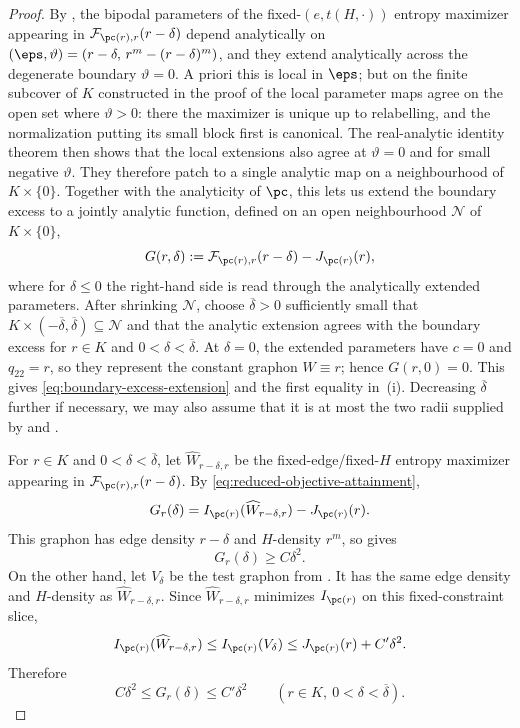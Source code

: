 \begin{proof}
By , the bipodal parameters of the fixed-$(e,t(H,\cdot))$
entropy maximizer appearing in $\mathcal F_{\pc(r),r}(r-\delta)$ depend
analytically on $(\eps,\vartheta)=(r-\delta,\,r^m-(r-\delta)^m)$, and they
extend analytically across the degenerate boundary $\vartheta=0$.  A priori
this is local in $\eps$; but on the finite subcover of $K$ constructed in the
proof of  the local parameter maps agree
on the open set where $\vartheta>0$: there the maximizer is unique up to
relabelling, and the normalization putting its small block first is canonical.
The real-analytic identity theorem then shows that the local extensions also
agree at $\vartheta=0$ and for small negative $\vartheta$.  They therefore
patch to a single analytic map on a neighbourhood of $K\times\{0\}$.  Together with the
analyticity of $\pc$, this lets us extend the boundary excess to a jointly
analytic function, defined on an open neighbourhood $\mathcal N$ of
$K\times\{0\}$,
\[
  G(r,\delta):=\mathcal F_{\pc(r),r}(r-\delta)-J_{\pc(r)}(r),
\]
where for $\delta\le0$ the right-hand side is read through the analytically
extended parameters.  After shrinking $\mathcal N$, choose
$\overline\delta>0$ sufficiently small that
$K\times(-\overline\delta,\overline\delta)\subseteq\mathcal N$ and that the
analytic extension agrees with the boundary excess for $r\in K$ and
$0<\delta<\overline\delta$.  At $\delta=0$, the extended parameters have
$c=0$ and $q_{22}=r$, so they represent the constant graphon $W\equiv r$;
hence $G(r,0)=0$.  This gives \eqref{eq:boundary-excess-extension} and the first equality
in~\textup{(i)}.
Decreasing $\overline\delta$ further if necessary, we may also assume that it
is at most the two radii supplied by  and
.

For $r\in K$ and $0<\delta<\overline\delta$, let
$\widehat W_{r-\delta,r}$ be the fixed-edge/fixed-$H$ entropy maximizer
appearing in \(\mathcal F_{\pc(r),r}(r-\delta)\).  By
\eqref{eq:reduced-objective-attainment},
\[
  G_r(\delta)
  =
  I_{\pc(r)}(\widehat W_{r-\delta,r})-J_{\pc(r)}(r).
\]
This graphon has edge density $r-\delta$ and $H$-density $r^m$, so
 gives
\[
  G_r(\delta)\ge C\delta^2.
\]
On the other hand, let $V_\delta$ be the test graphon from
.  It has the same edge density and $H$-density as
$\widehat W_{r-\delta,r}$.  Since $\widehat W_{r-\delta,r}$ minimizes
$I_{\pc(r)}$ on this fixed-constraint slice,
\[
  I_{\pc(r)}(\widehat W_{r-\delta,r})
  \le I_{\pc(r)}(V_\delta)
  \le J_{\pc(r)}(r)+C'\delta^2.
\]
Therefore
\[
  C\delta^2\le G_r(\delta)\le C'\delta^2
  \qquad(r\in K,\ 0<\delta<\overline\delta).
\]


\end{proof}
